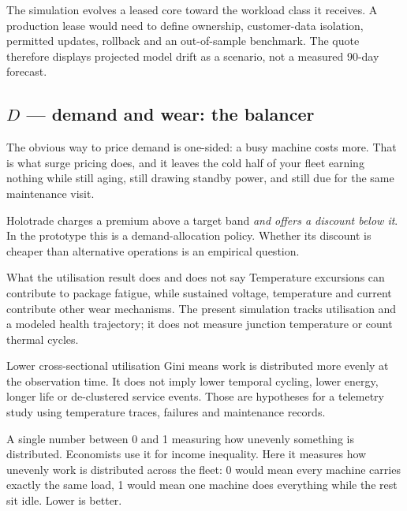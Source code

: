 \documentclass[11pt,letterpaper]{article}
\newcommand{\tagbox}[3]{\tikz[baseline=(X.base)]{\node[inner xsep=3.5pt,inner ysep=1.4pt,rounded corners=1.6pt,fill=#1,text=#2,font=\bfseries\sffamily\tiny] (X) {#3};}}
\newcommand{\MODELLED}{\tagbox{amberlite}{amber!55!black}{MODELLED}}
\begin{document}
\begin{warnbox}
The simulation evolves a leased core toward the workload class it receives.
\MODELLED{} A production lease would need to define ownership, customer-data
isolation, permitted updates, rollback and an out-of-sample benchmark. The
quote therefore displays projected model drift as a scenario, not a measured
90-day forecast.
\end{warnbox}

\subsection{$D$ --- demand and wear: the balancer}

\begin{plainbox}[]
The obvious way to price demand is one-sided: a busy machine costs more. That is
what surge pricing does, and it leaves the cold half of your fleet earning
nothing while still aging, still drawing standby power, and still due for the
same maintenance visit.

\vspace{4pt}
Holotrade charges a premium above a target band \emph{and offers a discount
below it}. In the prototype this is a demand-allocation policy. Whether its
discount is cheaper than alternative operations is an empirical question.
\end{plainbox}

\begin{keybox}{What the utilisation result does and does not say}
Temperature excursions can contribute to package fatigue, while sustained
voltage, temperature and current contribute other wear mechanisms. The present
simulation tracks utilisation and a modeled health trajectory; it does not
measure junction temperature or count thermal cycles.

\vspace{5pt}
Lower cross-sectional utilisation Gini means work is distributed more evenly at
the observation time. It does not imply lower temporal cycling, lower energy,
longer life or de-clustered service events. Those are hypotheses for a telemetry
study using temperature traces, failures and maintenance records.
\end{keybox}

\begin{plainbox}
A single number between 0 and 1 measuring how unevenly something is
distributed. Economists use it for income inequality. Here it measures how
unevenly work is distributed across the fleet: 0 would mean every machine
carries exactly the same load, 1 would mean one machine does everything while
the rest sit idle. Lower is better.
\end{plainbox}
\end{document}
